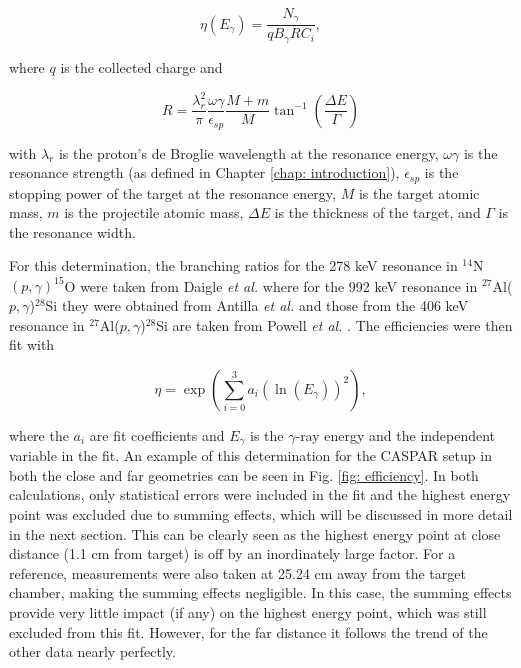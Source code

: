 \begin{equation}
\eta (E_{\gamma}) = \dfrac{N_{\gamma}}{q B_{\gamma} R C_{i}},
\end{equation}

\noindent where $q$ is the collected charge and

\begin{equation}
R = \dfrac{\lambda_{r}^{2}}{\pi} \dfrac{\omega \gamma}{\epsilon_{sp}} \dfrac{M + m}{M} \tan^{-1} \left( \dfrac{\Delta E}{\Gamma}  \right)
\label{eqn: resonanceFactor}
\end{equation}

\noindent with $\lambda_{r}$ is the proton's de Broglie wavelength at the resonance energy, $\omega \gamma$ is the resonance strength (as defined in Chapter \ref{chap: introduction}), $\epsilon_{sp}$ is the stopping power of the target at the resonance energy, $M$ is the target atomic mass, $m$ is the projectile atomic mass, $\Delta E$ is the thickness of the target, and $\Gamma$ is the resonance width. 

For this determination, the branching ratios for the 278 keV resonance in $^{14}$N$\left( p,\gamma \right) ^{15}$O were taken from Daigle \textit{et al.} \cite{Daigle2016} where for the 992 keV resonance in $^{27}$Al($p, \gamma$)$^{28}$Si they were obtained from Antilla \textit{et al.} \cite{Antilla1977} and those from the 406 keV resonance in $^{27}$Al($p, \gamma$)$^{28}$Si are taken from Powell \textit{et al.} \cite{Powell1998}. The efficiencies were then fit with 

\begin{equation}
\eta = \exp \left(  \sum_{i=0}^{3} a_{i} ( \ln (E_{\gamma}))^{2}    \right),
\end{equation}

\noindent where the $a_{i}$ are fit coefficients and $E_{\gamma}$ is the $\gamma$-ray energy and the independent variable in the fit. An example of this determination for the CASPAR setup in both the close and far geometries can be seen in Fig. \ref{fig: efficiency}. In both calculations, only statistical errors were included in the fit and the highest energy point was excluded due to summing effects, which will be discussed in more detail in the next section. This can be clearly seen as the highest energy point at close distance (1.1 cm from target) is off by an inordinately large factor. For a reference, measurements were also taken at 25.24 cm away from the target chamber, making the summing effects negligible. In this case, the summing effects provide very little impact (if any) on the highest energy point, which was still excluded from this fit. However, for the far distance it follows the trend of the other data nearly perfectly.


